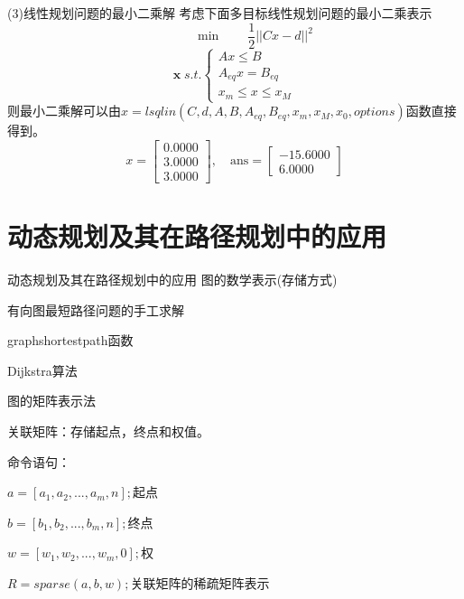 \documentclass[10pt]{beamer}
\begin{document}
  \begin{frame}[allowframebreaks]{(3)线性规划问题的最小二乘解}
    考虑下面多目标线性规划问题的最小二乘表示
      $$\quad \qquad \min \qquad \frac{1}{2}||Cx-d||^2$$
    $$
    \bm{x}\;s.t.
    \left\{
    \begin{array}{ccc}
      Ax\leq B\\
      A_{eq}x=B_{eq}\\
      x_m\leq x\leq x_M
    \end{array} 
    \right.
    $$
    则最小二乘解可以由$x = lsqlin(C,d,A,B,A_{eq},B_{eq},x_m,x_M,x_0,options)$函数直接得到。
    \begin{equation}
      x =
      \begin{bmatrix}
        0.0000\\
  3.0000\\
  3.0000

      \end{bmatrix},\quad
      \mathrm{ans} =
      \begin{bmatrix}
        -15.6000\\
        6.0000
        \end{bmatrix}
    \end{equation}
\end{frame}

\section{动态规划及其在路径规划中的应用}
\begin{frame}[allowframebreaks]{动态规划及其在路径规划中的应用}
  图的数学表示(存储方式)
  
  有向图最短路径问题的手工求解
  
  graphshortestpath函数
  
  Dijkstra算法
\end{frame}

\begin{frame}[allowframebreaks]{图的矩阵表示法}

关联矩阵：存储起点，终点和权值。

命令语句：

$a=[a_1,a_2,...,a_m,n];$起点

$b=[b_1,b_2,...,b_m,n];$终点

$w=[w_1,w_2,...,w_m,0];$权

$R=sparse(a,b,w);$关联矩阵的稀疏矩阵表示

\end{frame}
\end{document}
